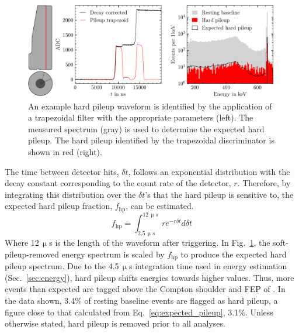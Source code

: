 \begin{figure}[htb]
    \centering
    \includegraphics[width=6in]{figs/param/hard_pileup_6_9in.pdf}
    \caption{An example hard pileup waveform is identified by the application of a trapezoidal filter with the appropriate parameters (left). The measured \CsS{} spectrum (gray) is used to determine the expected hard pileup. The hard pileup identified by the trapezoidal discriminator is shown in red (right).}
    \label{fig:hard_pileup}
\end{figure}
The time between detector hits, $\delta t$, follows an exponential distribution with the decay constant corresponding to the count rate of the detector, $r$. Therefore, by integrating this distribution over the $\delta t$'s that the hard pileup is sensitive to, the expected hard pileup fraction, $f_\text{hp}$, can be estimated. 
\begin{equation}
	f_\text{hp} = \int_{2.5\,\upmu s}^{12\,\upmu s}re^{-r\delta t}d\delta t 
	\label{eq:expected_pileup}
\end{equation}
Where 12\,$\upmu$s is the length of the waveform after triggering. In Fig.~\ref{fig:hard_pileup}, the soft-pileup-removed energy spectrum is scaled by $f_\text{hp}$ to produce the expected hard pileup spectrum. Due to the 4.5\,$\upmu$s integration time used in energy estimation (Sec.~\ref{sec:energy}), hard pileup shifts energies towards higher values. Thus, more events than expected are tagged above the Compton shoulder and FEP of \CsS{}. In the data shown, 3.4\% of resting baseline events are flagged as hard pileup, a figure close to that calculated from Eq.~\ref{eq:expected_pileup}, 3.1\%. Unless otherwise stated, hard pileup is removed prior to all analyses. 

